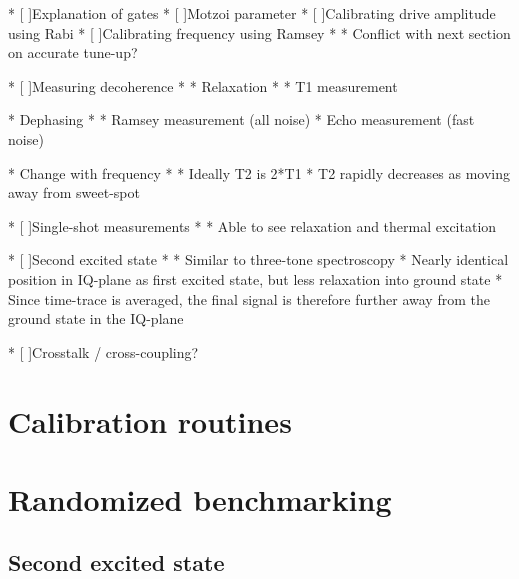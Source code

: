 \documentclass[12pt]{report}
\begin{document}
  * [ ]Explanation of gates
  * [ ]Motzoi parameter
  * [ ]Calibrating drive amplitude using Rabi
  * [ ]Calibrating frequency using Ramsey
  *
    * Conflict with next section on accurate tune-up?

  * [ ]Measuring decoherence
  *
    * Relaxation
    *
      * T1 measurement

    * Dephasing
    *
      * Ramsey measurement (all noise)
      * Echo measurement (fast noise)

    * Change with frequency
    *
      * Ideally T2 is 2*T1
      * T2 rapidly decreases as moving away from sweet-spot


  * [ ]Single-shot measurements
  *
    * Able to see relaxation and thermal excitation

  * [ ]Second excited state
  *
    * Similar to three-tone spectroscopy
    * Nearly identical position in IQ-plane as first excited state, but less relaxation into ground state
    * Since time-trace is averaged, the final signal is therefore further away from the ground state in the IQ-plane

  * [ ]Crosstalk / cross-coupling?




  \chapter{Calibration routines}


  \chapter{Randomized benchmarking}

    \section{Second excited state}
\end{document}
